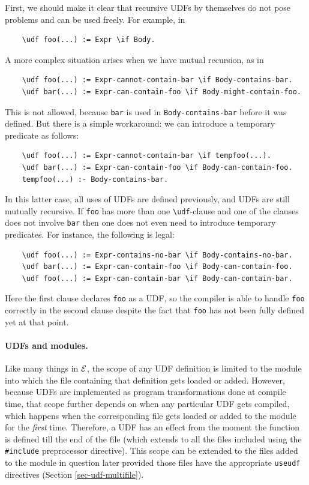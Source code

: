 \documentclass[11pt]{article}
\newcommand{\ERGO}{\mbox{\ensuremath{\cal{E}}\smaller{{\sc{RGO}}}}\xspace}
\newcommand{\bs}{\textbackslash}
\begin{document}
First, we should make it clear that recursive UDFs by themselves do not
pose problems and can be used freely.  For example, in
\begin{verbatim}
    \udf foo(...) := Expr \if Body.
\end{verbatim}
A more complex situation arises when we have mutual recursion, as in
\begin{verbatim}
    \udf foo(...) := Expr-cannot-contain-bar \if Body-contains-bar.
    \udf bar(...) := Expr-can-contain-foo \if Body-might-contain-foo.
\end{verbatim}
This is not allowed, because \texttt{bar} is used in
\texttt{Body-contains-bar} before it was defined.
But there is a simple workaround: we can introduce a
temporary predicate as follows:
\begin{verbatim}
    \udf foo(...) := Expr-cannot-contain-bar \if tempfoo(...).
    \udf bar(...) := Expr-can-contain-foo \if Body-can-contain-foo.
    tempfoo(...) :- Body-contains-bar.
\end{verbatim}
In this latter case, all uses of UDFs are defined previously, and UDFs are
still mutually recursive. If \texttt{foo} has more than one
\texttt{\bs{}udf}-clause and one of the clauses does not involve
\texttt{bar} then one does not even need to introduce temporary predicates. For
instance, the following is legal:   
\begin{verbatim}
    \udf foo(...) := Expr-contains-no-bar \if Body-contains-no-bar.
    \udf bar(...) := Expr-can-contain-foo \if Body-can-contain-foo.
    \udf foo(...) := Expr-can-contain-bar \if Body-can-contain-bar.
\end{verbatim}
Here the first clause declares \texttt{foo} as a UDF, so the compiler is
able to handle \texttt{foo} correctly in the second clause despite the fact
that \texttt{foo} has not been fully defined yet at that point. 

\paragraph{UDFs and modules.}
Like many things in \ERGO, the scope of any  UDF definition is limited to
the module into which the file containing that definition gets loaded or
added. However, because UDFs are implemented as program transformations
done at compile time, that scope further depends on when any particular UDF
gets compiled, which happens when the corresponding file gets loaded or
added to the module for the \emph{first} time. 
Therefore, a UDF  has an effect from
the moment the function is defined till the end of the file (which extends to
all the files included using the \texttt{\#include} preprocessor
directive).
This scope can be extended to the files added to the module in question 
later provided those files have the appropriate \texttt{useudf} directives
(Section \ref{sec-udf-multifile}). 
\end{document}
